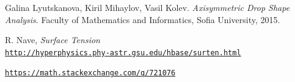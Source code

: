 \documentclass{article}
\begin{document}
\begin{thebibliography}{9}
Galina Lyutskanova, Kiril Mihaylov, Vasil Kolev.
\textit{Axisymmetric Drop Shape Analysis}. 
Faculty of Mathematics and Informatics, Sofia University, 2015.

R. Nave, \textit{Surface Tension}
\\\texttt{\url{http://hyperphysics.phy-astr.gsu.edu/hbase/surten.html}}

\texttt{\url{https://math.stackexchange.com/q/721076}}

\end{thebibliography}
\end{document}
